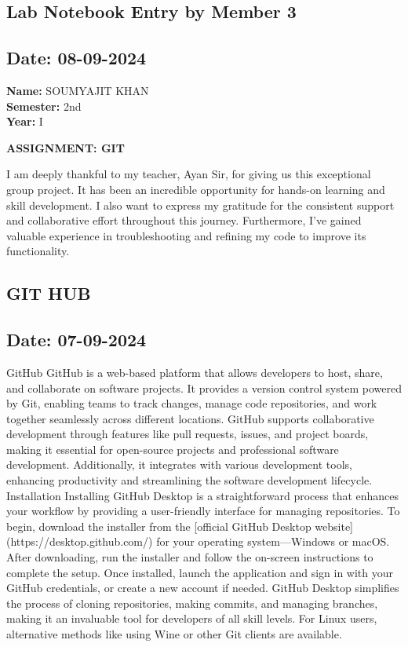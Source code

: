 \documentclass[12pt]{article}
\begin{document}
\subsection*{Lab Notebook Entry by Member 3}
\subsection*{Date: 08-09-2024}

\begin{flushright}
\textbf{Name:} SOUMYAJIT KHAN \\
\textbf{Semester:} 2nd \\
\textbf{Year:} I \\
\end{flushright}

\begin{center}
\Huge \textbf{ASSIGNMENT: GIT}
\end{center}

I am deeply thankful to my teacher, Ayan Sir, for giving us this exceptional group project. It has been an incredible opportunity for hands-on learning and skill development. I also want to express my gratitude for the consistent support and collaborative effort throughout this journey. Furthermore, I've gained valuable experience in troubleshooting and refining my code to improve its functionality.

\newpage
\subsection*{GIT HUB}
\subsection*{Date: 07-09-2024}
GitHub
GitHub is a web-based platform that allows developers to host, share, and
collaborate on software projects. It provides a version control system
powered by Git, enabling teams to track changes, manage code repositories,
and work together seamlessly across different locations. GitHub supports
collaborative development through features like pull requests, issues, and
project boards, making it essential for open-source projects and professional
software development. Additionally, it integrates with various development
tools, enhancing productivity and streamlining the software development
lifecycle.
Installation
Installing GitHub Desktop is a straightforward process that enhances your
workflow by providing a user-friendly interface for managing repositories.
To begin, download the installer from the [official GitHub Desktop
website](https://desktop.github.com/) for your operating system—Windows
or macOS. After downloading, run the installer and follow the on-screen
instructions to complete the setup. Once installed, launch the application
and sign in with your GitHub credentials, or create a new account if needed.
GitHub Desktop simplifies the process of cloning repositories, making
commits, and managing branches, making it an invaluable tool for
developers of all skill levels. For Linux users, alternative methods like using
Wine or other Git clients are available.
\end{document}
